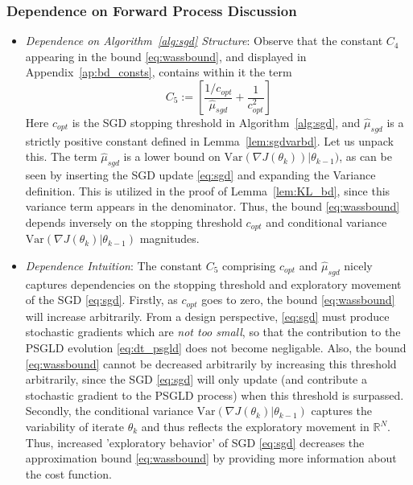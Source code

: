 \documentclass[journal,onecolumn]{IEEEtran}
\newcommand{\thk}{\theta_k}
\newcommand{\grad}{\nabla}
\newcommand{\rew}{J}
\newcommand{\reals}{\mathbb{R}}
\newcommand{\dimn}{N}
\newcommand{\sgdtm}{c_{opt}}
\begin{document}
\vspace{0.1cm}
{\color{black}\subsubsection{Dependence on Forward Process Discussion}
\label{subsec:fwdprocdep}

\begin{itemize}
    \item[-] \textit{Dependence on Algorithm~\ref{alg:sgd} Structure}: Observe that the constant $C_4$ appearing in the bound \eqref{eq:wassbound}, and displayed in Appendix~\ref{ap:bd_consts}, contains within it the term \[C_5 := \left[\frac{1/\sgdtm}{\hat{\mu}_{sgd}} + \frac{1}{\sgdtm^2} \right]\] Here $\sgdtm$ is the SGD stopping threshold in Algorithm~\ref{alg:sgd}, and $\hat{\mu}_{sgd}$ is a strictly positive constant defined in Lemma~\ref{lem:sgdvarbd}. Let us unpack this. The term $\hat{\mu}_{sgd}$ is a lower bound on $\textrm{Var}(\grad\rew(\thk)) | \theta_{k-1})$, as can be seen by inserting the SGD update \eqref{eq:sgd} and expanding the Variance definition. This is utilized in the proof of Lemma~\ref{lem:KL_bd}, since this variance term appears in the denominator. Thus, the bound \eqref{eq:wassbound} depends inversely on the stopping threshold $\sgdtm$ and conditional variance $\textrm{Var}(\grad\rew(\thk) | \theta_{k-1})$ magnitudes. 

    \item[-] \textit{Dependence Intuition}: The constant $C_5$ comprising $\sgdtm$ and $\hat{\mu}_{sgd}$ nicely captures dependencies on the stopping threshold and exploratory movement of the SGD \eqref{eq:sgd}. Firstly, as $\sgdtm$ goes to zero, the bound \eqref{eq:wassbound} will increase arbitrarily. From a design perspective, \eqref{eq:sgd} must produce stochastic gradients which are \textit{not too small}, so that the contribution to the PSGLD evolution \eqref{eq:dt_psgld} does not become negligable. Also, the bound \eqref{eq:wassbound} cannot be decreased arbitrarily by increasing this threshold arbitrarily, since the SGD \eqref{eq:sgd} will only update (and contribute a stochastic gradient to the PSGLD process) when this threshold is surpassed. Secondly, the conditional variance $\textrm{Var}(\grad\rew(\thk) | \theta_{k-1})$ captures the variability of iterate $\thk$ and thus reflects the exploratory movement in $\reals^{\dimn}$. Thus, increased 'exploratory behavior' of SGD \eqref{eq:sgd} decreases the approximation bound \eqref{eq:wassbound} by providing more information about the cost function. 


\end{itemize}}
\end{document}
